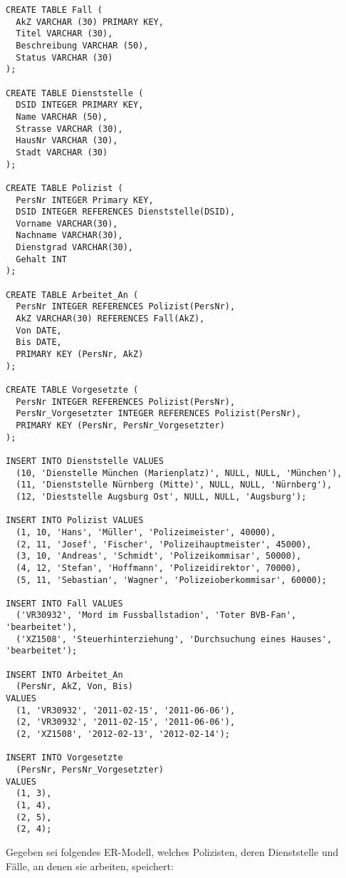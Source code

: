 \documentclass{bschlangaul-aufgabe}
\begin{document}
\begin{liAdditum}[Übungsdatenbank]
\begin{verbatim}
CREATE TABLE Fall (
  AkZ VARCHAR (30) PRIMARY KEY,
  Titel VARCHAR (30),
  Beschreibung VARCHAR (50),
  Status VARCHAR (30)
);

CREATE TABLE Dienststelle (
  DSID INTEGER PRIMARY KEY,
  Name VARCHAR (50),
  Strasse VARCHAR (30),
  HausNr VARCHAR (30),
  Stadt VARCHAR (30)
);

CREATE TABLE Polizist (
  PersNr INTEGER Primary KEY,
  DSID INTEGER REFERENCES Dienststelle(DSID),
  Vorname VARCHAR(30),
  Nachname VARCHAR(30),
  Dienstgrad VARCHAR(30),
  Gehalt INT
);

CREATE TABLE Arbeitet_An (
  PersNr INTEGER REFERENCES Polizist(PersNr),
  AkZ VARCHAR(30) REFERENCES Fall(AkZ),
  Von DATE,
  Bis DATE,
  PRIMARY KEY (PersNr, AkZ)
);

CREATE TABLE Vorgesetzte (
  PersNr INTEGER REFERENCES Polizist(PersNr),
  PersNr_Vorgesetzter INTEGER REFERENCES Polizist(PersNr),
  PRIMARY KEY (PersNr, PersNr_Vorgesetzter)
);

INSERT INTO Dienststelle VALUES
  (10, 'Dienstelle München (Marienplatz)', NULL, NULL, 'München'),
  (11, 'Dienststelle Nürnberg (Mitte)', NULL, NULL, 'Nürnberg'),
  (12, 'Dieststelle Augsburg Ost', NULL, NULL, 'Augsburg');

INSERT INTO Polizist VALUES
  (1, 10, 'Hans', 'Müller', 'Polizeimeister', 40000),
  (2, 11, 'Josef', 'Fischer', 'Polizeihauptmeister', 45000),
  (3, 10, 'Andreas', 'Schmidt', 'Polizeikommisar', 50000),
  (4, 12, 'Stefan', 'Hoffmann', 'Polizeidirektor', 70000),
  (5, 11, 'Sebastian', 'Wagner', 'Polizeioberkommisar', 60000);

INSERT INTO Fall VALUES
  ('VR30932', 'Mord im Fussballstadion', 'Toter BVB-Fan', 'bearbeitet'),
  ('XZ1508', 'Steuerhinterziehung', 'Durchsuchung eines Hauses', 'bearbeitet');

INSERT INTO Arbeitet_An
  (PersNr, AkZ, Von, Bis)
VALUES
  (1, 'VR30932', '2011-02-15', '2011-06-06'),
  (2, 'VR30932', '2011-02-15', '2011-06-06'),
  (2, 'XZ1508', '2012-02-13', '2012-02-14');

INSERT INTO Vorgesetzte
  (PersNr, PersNr_Vorgesetzter)
VALUES
  (1, 3),
  (1, 4),
  (2, 5),
  (2, 4);
\end{verbatim}
\end{liAdditum}

\noindent
Gegeben sei folgendes ER-Modell, welches Polizisten, deren Dienststelle
und Fälle, an denen sie arbeiten, speichert:
\end{document}
